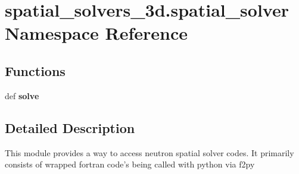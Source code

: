 \hypertarget{namespacespatial__solvers__3d_1_1spatial__solver}{\section{spatial\-\_\-solvers\-\_\-3d.\-spatial\-\_\-solver Namespace Reference}
\label{namespacespatial__solvers__3d_1_1spatial__solver}
}
\subsection*{Functions}
\begin{DoxyCompactItemize}
\item 
\hypertarget{namespacespatial__solvers__3d_1_1spatial__solver_a0415c6be183412b48ecdd6f5705db882}{def {\bfseries solve}}\label{namespacespatial__solvers__3d_1_1spatial__solver_a0415c6be183412b48ecdd6f5705db882}

\end{DoxyCompactItemize}


\subsection{Detailed Description}
\begin{DoxyVerb}This module provides a way to access neutron spatial solver codes.  It primarily consists of wrapped fortran code's being called with python via f2py\end{DoxyVerb}
 